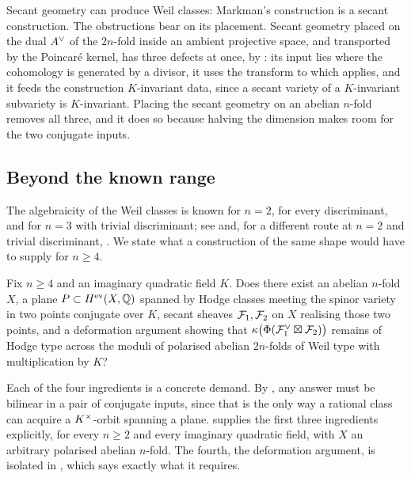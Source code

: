 \begin{remark}\label{rem:secantlesson}
Secant geometry can produce Weil classes: Markman's construction is a secant
construction. The obstructions bear on its placement. Secant geometry placed
on the dual $A^{\vee}$ of the $2n$-fold inside an ambient projective space, and
transported by the Poincar\'e kernel, has three defects at once, by
: its input lies where the cohomology is generated by
a divisor, it uses the transform to which  applies, and it
feeds the construction $K$-invariant data, since a secant variety of a
$K$-invariant subvariety is $K$-invariant. Placing the secant geometry on an
abelian $n$-fold removes all three, and it does so because halving the
dimension makes room for the two conjugate inputs.
\end{remark}

\subsection{Beyond the known range}

The algebraicity of the Weil classes is known for $n=2$, for every
discriminant, and for $n=3$ with trivial discriminant; see \cite{Mar25b} and,
for a different route at $n=2$ and trivial discriminant, \cite{FF26}. We state
what a construction of the same shape would have to supply for $n\ge4$.

\begin{question}\label{q:higher}
Fix $n\ge4$ and an imaginary quadratic field $K$. Does there exist an abelian
$n$-fold $X$, a plane $P\subset H^{\mathrm{ev}}(X,\mathbb{Q})$ spanned by Hodge
classes meeting the spinor variety in two points conjugate over $K$, secant
sheaves $\mathcal{F}_{1},\mathcal{F}_{2}$ on $X$ realising those two points, and a deformation
argument showing that $\kappa\bigl(\Phi(\mathcal{F}_{1}^{\vee}\boxtimes\mathcal{F}_{2})\bigr)$
remains of Hodge type across the moduli of polarised abelian $2n$-folds of
Weil type with multiplication by $K$?
\end{question}

Each of the four ingredients is a concrete demand. By
, any answer must be bilinear in a pair of conjugate
inputs, since that is the only way a rational class can acquire a
$K^{\times}$-orbit spanning a plane.  supplies the first three
ingredients explicitly, for every $n\ge2$ and every imaginary quadratic field,
with $X$ an arbitrary polarised abelian $n$-fold. The fourth, the deformation
argument, is isolated in , which says exactly what it
requires.


